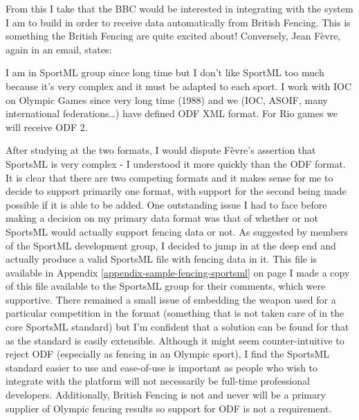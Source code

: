 From this I take that the BBC would be interested in integrating with the system
I am to build in order to receive data automatically from British Fencing. This
is something the British Fencing are quite excited about! Conversely, Jean
F\`{e}vre, again in an email, states:
\begin{displayquote}
I am in SportML group since long time but I don’t like SportML too much because
it’s very complex and it must be adapted to each sport.
I work with IOC on Olympic Games since very long time (1988) and we (IOC, ASOIF,
many international federations…) have defined ODF XML format.
For Rio games we will receive ODF 2. \citep{ferveemail20160203}
\end{displayquote}
After studying at the two formats, I would dispute F\`{e}vre's assertion that
SportsML is very complex - I understood it more quickly than the ODF format.
It is clear that there are two competing formats and it makes sense for me to
decide to support primarily one format, with support for the second being made
possible if it is able to be added.
One outstanding issue I had to face before making a decision on my primary data
format was that of whether or not SportsML would actually support fencing data
or not. As suggested by members of the SportML development group, I decided to
jump in at the deep end and actually produce a valid SportsML file with fencing
data in it. This file is available in Appendix
\ref{appendix-sample-fencing-sportsml} on page
\pageref{appendix-sample-fencing-sportsml} I made a copy of this file available
to the SportsML group for their comments, which were supportive. There remained
a small issue of embedding the weapon used for a particular competition in the
format (something that is not taken care of in the core SportsML standard) but
I'm confident that a solution can be found for that as the standard is easily
extensible. Although it might seem counter-intuitive to reject ODF (especially
as fencing in an Olympic sport), I find the SportsML standard easier to use and
ease-of-use is important as people who wish to integrate with the platform will
not necessarily be full-time professional developers. Additionally, British
Fencing is not and never will be a primary supplier of Olympic fencing results
so support for ODF is not a requirement.